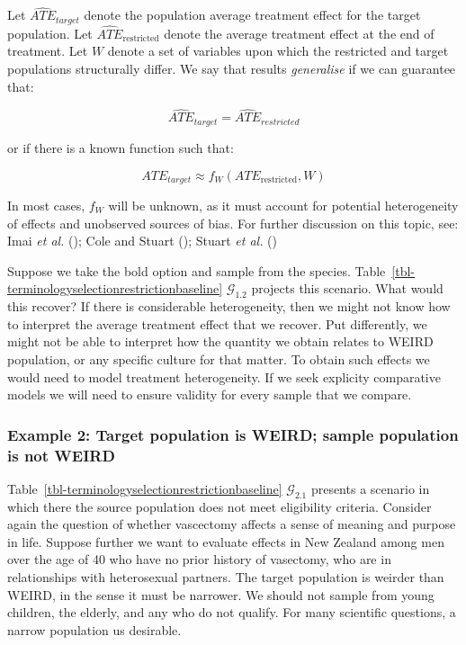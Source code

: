 \documentclass[
  single column]{article}
\begin{document}
Let \(\widehat{ATE}_{target}\) denote the population average treatment
effect for the target population. Let
\(\widehat{ATE}_{\text{restricted}}\) denote the average treatment
effect at the end of treatment. Let \(W\) denote a set of variables upon
which the restricted and target populations structurally differ. We say
that results \emph{generalise} if we can guarantee that:

\[
\widehat{ATE}_{target} =  \widehat{ATE}_{restricted} 
\]

or if there is a known function such that:

\[
ATE_{target}\approx  f_W(ATE_{\text{restricted}}, W)
\]

In most cases, \(f_W\) will be unknown, as it must account for potential
heterogeneity of effects and unobserved sources of bias. For further
discussion on this topic, see: Imai \emph{et al.}
(); Cole and Stuart
(); Stuart \emph{et al.}
()

Suppose we take the bold option and sample from the species.
Table~\ref{tbl-terminologyselectionrestrictionbaseline}
\(\mathcal{G}_{1.2}\) projects this scenario. What would this recover?
If there is considerable heterogeneity, then we might not know how to
interpret the average treatment effect that we recover. Put differently,
we might not be able to interpret how the quantity we obtain relates to
WEIRD population, or any specific culture for that matter. To obtain
such effects we would need to model treatment heterogeneity. If we seek
explicity comparative models we will need to ensure validity for every
sample that we compare.

\subsubsection{Example 2: Target population is WEIRD; sample population
is not
WEIRD}\label{example-2-target-population-is-weird-sample-population-is-not-weird}

Table~\ref{tbl-terminologyselectionrestrictionbaseline}
\(\mathcal{G}_{2.1}\) presents a scenario in which there the source
population does not meet eligibility criteria. Consider again the
question of whether vascectomy affects a sense of meaning and purpose in
life. Suppose further we want to evaluate effects in New Zealand among
men over the age of 40 who have no prior history of vasectomy, who are
in relationships with heterosexual partners. The target population is
weirder than WEIRD, in the sense it must be narrower. We should not
sample from young children, the elderly, and any who do not qualify. For
many scientific questions, a narrow population us desirable.
\end{document}
